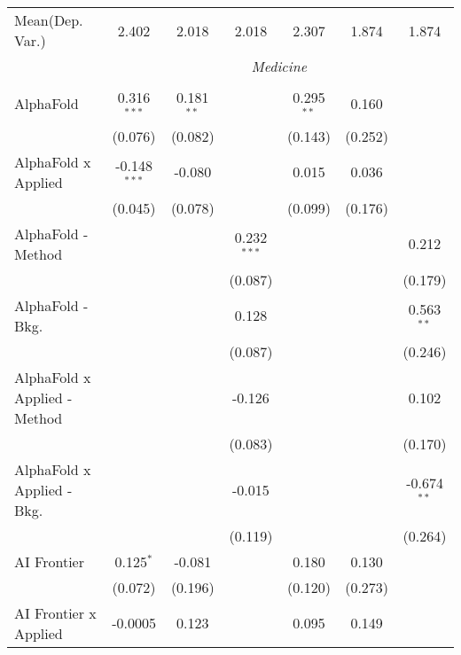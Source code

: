 \begin{tabular}{lcccccc}
Mean(Dep. Var.) & 2.402 & 2.018 & 2.018 & 2.307 & 1.874 & 1.874 \\
 & \multicolumn{6}{c}{\textit{Medicine}} \\ \\
   AlphaFold                      & 0.316$^{***}$  & 0.181$^{**}$   &               & 0.295$^{**}$  & 0.160   &   \\   
                                  & (0.076)        & (0.082)        &               & (0.143)       & (0.252) &   \\   
   AlphaFold x Applied            & -0.148$^{***}$ & -0.080         &               & 0.015         & 0.036   &   \\   
                                  & (0.045)        & (0.078)        &               & (0.099)       & (0.176) &   \\   
   AlphaFold - Method             &                &                & 0.232$^{***}$ &               &         & 0.212\\   
                                  &                &                & (0.087)       &               &         & (0.179)\\   
   AlphaFold - Bkg.               &                &                & 0.128         &               &         & 0.563$^{**}$\\   
                                  &                &                & (0.087)       &               &         & (0.246)\\   
   AlphaFold x Applied - Method   &                &                & -0.126        &               &         & 0.102\\   
                                  &                &                & (0.083)       &               &         & (0.170)\\   
   AlphaFold x Applied - Bkg.     &                &                & -0.015        &               &         & -0.674$^{**}$\\   
                                  &                &                & (0.119)       &               &         & (0.264)\\   
   AI Frontier                    & 0.125$^{*}$    & -0.081         &               & 0.180         & 0.130   &   \\   
                                  & (0.072)        & (0.196)        &               & (0.120)       & (0.273) &   \\   
   AI Frontier x Applied          & -0.0005        & 0.123          &               & 0.095         & 0.149   &   \\   

\end{tabular}
